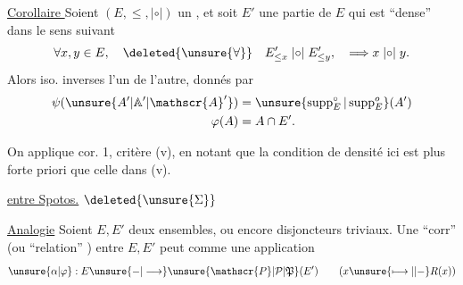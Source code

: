
\uline{Corollaire } Soient $(E,\leq,\mathrel{|{\circ}|})$ un  , et soit $E'$ une partie de $E$ qui est ``dense'' dans le sens suivant
\[
\forall x,y\in E,\quad\deleted{\unsure{\forall}}\quad
E'_{\leq x}\mathrel{|{\circ}|}E'_{\leq y},\quad\Longrightarrow x\mathrel{|{\circ}|}y.
\]
Alors
iso. inverses l'un de l'autre, donnés par
\[
\begin{aligned}
\psi(\unsure{A'|\mathbb{A}'|\mathscr{A}'})&=\unsure{\operatorname{supp}^{\circ}_E|\operatorname{supp}^{o}_E}(A')\\
\varphi(A)&=A\cap E'.
\end{aligned}
\]

On applique cor. 1, critère (v), en notant que la condition de densité ici est plus forte  priori que celle dans (v).


 \uline{ entre  Spotos.} $\deleted{\unsure{\Sigma}}$

 \uline{Analogie} Soient $E,E'$ deux ensembles,  ou encore disjoncteurs triviaux. Une ``corr'' (ou ``relation'' ) entre $E,E'$ peut   comme une application
\[
\unsure{\alpha|\varphi}:E\unsure{{-}|\longrightarrow}\unsure{\mathscr{P}|\mathcal{P}|\mathfrak{P}}(E')
\qquad(x\unsure{\longmapsto|{\mid}{-}}R(x))
\]
